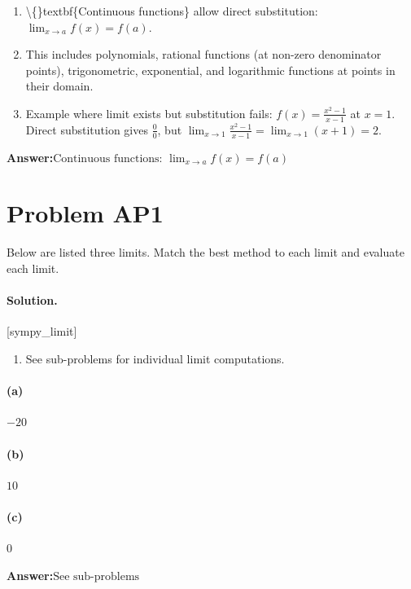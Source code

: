 \documentclass[11pt,a4paper]{article}
\newcommand{\solvertag}[1]{{\footnotesize\color{gray}\textsf{[#1]}}}
\begin{document}
\begin{enumerate}[leftmargin=*]
  \item \textbackslash\{\}textbf\{Continuous functions\} allow direct substitution: $\lim_{x \to a} f(x) = f(a)$.
  \item This includes polynomials, rational functions (at non-zero denominator points), trigonometric, exponential, and logarithmic functions at points in their domain.
  \item Example where limit exists but substitution fails: $f(x) = \frac{x^2 - 1}{x - 1}$ at $x = 1$. Direct substitution gives $\frac{0}{0}$, but $\lim_{x \to 1} \frac{x^2-1}{x-1} = \lim_{x \to 1}(x+1) = 2$.
\end{enumerate}

\noindent\textbf{Answer:}\quad $\text{Continuous functions: } \lim_{x \to a} f(x) = f(a)$

\medskip

\section*{Problem AP1}
Below are listed three limits. Match the best method to each limit and evaluate each limit.

\paragraph{Solution.} \solvertag{sympy\_limit} 

\begin{enumerate}[leftmargin=*]
  \item See sub-problems for individual limit computations.
\end{enumerate}

\paragraph{(a)} $-20$

\paragraph{(b)} $10$

\paragraph{(c)} $0$

\noindent\textbf{Answer:}\quad $\text{See sub-problems}$

\medskip
\end{document}

